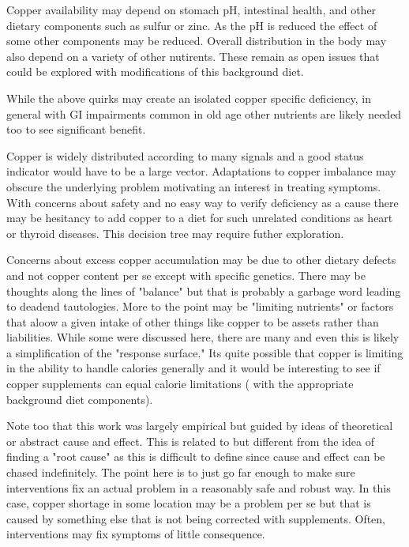 
Copper availability may depend on stomach pH, intestinal health,
 and other dietary
components such as sulfur or zinc. As the pH is reduced the effect of
some other components may be reduced. Overall distribution in the body
may also depend on a variety of other nutirents.  These remain as open
issues that could be explored with modifications of this background diet.

While the above quirks may create an isolated copper specific deficiency,
in general with GI impairments common in old age other nutrients
are likely needed too to see significant benefit.

Copper is widely distributed according to many signals and
a good status indicator would have to be a large vector.
Adaptations to copper imbalance may obscure the underlying problem
motivating an interest in treating symptoms. With concerns about
safety and no easy way to verify deficiency as a cause there may
be hesitancy to add copper to a diet for such unrelated conditions
as heart or thyroid diseases.  This decision tree may 
require futher exploration. 

Concerns about excess copper accumulation may be due to other dietary defects
and not copper content per se except with specific genetics.  
There may be thoughts along the
lines of "balance" but that is probably a garbage word leading
to deadend tautologies. More to the point may be "limiting nutrients" or
factors that aloow a given intake of other things like copper
to be assets rather than liabilities. While some were discussed here,
there are many and even this is likely a simplification of 
the "response surface." Its quite possible that copper is limiting
in the ability to handle calories generally and it would be interesting
to see if copper supplements can equal calorie limitations ( with the
appropriate background diet components).  


Note too that this work was largely empirical but guided
by ideas of theoretical or abstract cause and effect. 
This is related to but different from the idea of finding a "root
cause" as this is difficult to define since cause and effect can be
chased indefinitely.  The point here is to just go far enough to
make sure interventions fix an actual problem in a reasonably
safe and robust way. In this case, copper shortage in some location may
be a problem per se but that is caused by something else that is not
being corrected with supplements. 
Often, interventions may fix symptoms of little consequence.
 
